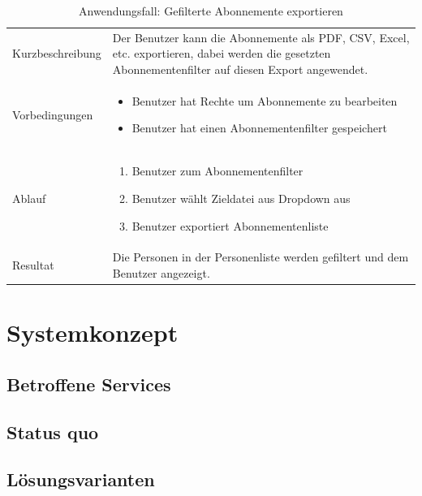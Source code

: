 \begin{table}[h!]
   \begin{tabular}{|L{0.3\textwidth}|L{0.6\textwidth}|}
      \hline
        \\[4pt]
      \hline
      Kurzbeschreibung & Der Benutzer kann die Abonnemente als PDF, CSV, Excel, etc. exportieren, dabei werden
      die gesetzten Abonnementenfilter auf diesen Export angewendet. \\
      \hline
      Vorbedingungen & \begin{itemize}
         \item Benutzer hat Rechte um Abonnemente zu bearbeiten
         \item Benutzer hat einen Abonnementenfilter gespeichert
         \end{itemize}  \\
      \hline
      Ablauf & \begin{enumerate}
      \item Benutzer zum Abonnementenfilter
      \item Benutzer wählt Zieldatei aus Dropdown aus
      \item Benutzer exportiert Abonnementenliste
      \end{enumerate}  \\
      \hline
      Resultat & Die Personen in der Personenliste werden gefiltert und dem Benutzer angezeigt. \\
      \hline
   \end{tabular}
   \caption{Anwendungsfall: Gefilterte Abonnemente exportieren}
\end{table}

\newpage
\newpage

\section{Systemkonzept}
\subsection{Betroffene Services}
\subsection{Status quo}
\subsection{Lösungsvarianten}
